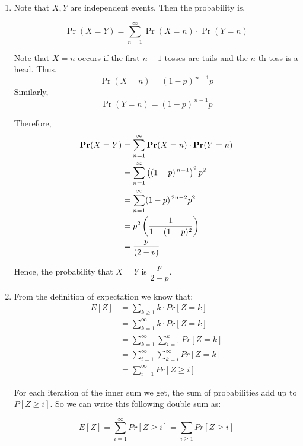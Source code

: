 \documentclass[12pt]{article}
\begin{document}
\begin{solution}
    \bbni
    \begin{enumerate}
        \item [(a)] Note that $X, Y$ are independent events. Then the probability is, 

        \[\Pr(X  = Y) = \sum_{n=1}^\infty \Pr(X =n) \cdot \Pr(Y = n)\]
        
        Note that $X=n$ occurs if the first $n-1$ tosses are tails and the $n$-th toss is a head. Thus,
        \[ \Pr(X = n) =(1-p)^{\,n-1} p\]
        Similarly, 
        \[ \Pr(Y = n) =(1-p)^{\,n-1} p\]

        Therefore, 
        \begin{align*}
            \operatorname{\mathbf{Pr}}(X  = Y) &= \sum_{n=1}^\infty \operatorname{\mathbf{Pr}}(X =n) \cdot \operatorname{\mathbf{Pr}}(Y = n) \\
            &= \sum_{n=1}^\infty \left( (1-p)^{\,n-1}  \right )^2 p^2 \\ 
            &= \sum_{n=1}^\infty  (1-p)^{\,2n-2}   p^2 \\ 
            &= p^2 \left(\frac{1}{1 - (1-p)^2}\right) \\ 
            &= \frac{p}{(2 - p)}
        \end{align*}

        Hence, the probability that $X=Y$ is $\dfrac{p}{2-p}$.

        \item [(b)] From the definition of expectation we know that:\\

        \begin{align*}
             E[Z] &= \sum_{k \geq 1} k \cdot Pr[Z=k] \\ 
             &= \sum_{k =1}^{\infty} k \cdot Pr[Z=k] \\ 
             &=  \sum_{k =1}^{\infty}\sum_{i=1}^{k}Pr[Z =k] \\ 
             &= \sum_{i=1}^\infty \sum_{k=i}^{\infty} Pr[Z=k]  \\ 
             &= \sum_{i=1}^\infty Pr[Z \geq i]
        \end{align*}

                    For each iteration of the inner sum we get, the sum of probabilities add up to  $P[Z \geq i]$. So we can write this following double sum as: 

                        \[
                        E[Z] = \sum_{i=1}^{\infty} Pr[Z \geq i] =  \sum_{i\geq1} Pr[Z \geq i] 
                         \]
                                



\end{enumerate}
\end{solution}
\end{document}
